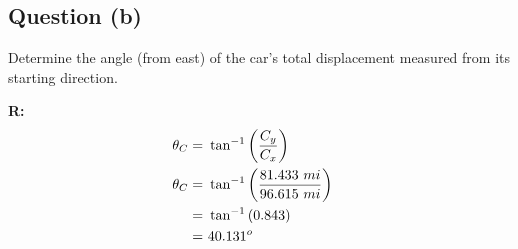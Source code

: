 	\subsection{Question (b)}

		Determine the angle (from east) of the car's total displacement measured from its starting direction.

		\textbf{R:} \newline
		\begin{align}
			\theta_{C} = \ &\tan^{-1} \left( \frac{C_{y}}{C_{x}} \right)& \notag \\
			\theta_{C} = \ &\tan^{-1} \left( \frac{81.433 \ mi}{96.615 \ mi} \right)& \notag \\
			= \ &\tan^{-1} \left( 0.843 \right)& \notag \\
			= \ &40.131^{o}&
		\end{align}
